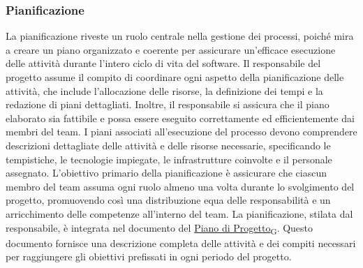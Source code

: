 \subsubsection{Pianificazione}
La pianificazione riveste un ruolo centrale nella gestione dei processi, poiché mira a creare un piano organizzato e coerente per assicurare un’efficace esecuzione delle attività durante l’intero ciclo di vita del software.
Il responsabile del progetto assume il compito di coordinare ogni aspetto della pianificazione delle attività, che include l’allocazione delle risorse, la definizione dei tempi e la redazione di piani dettagliati. Inoltre, il responsabile si assicura che il piano elaborato sia fattibile e possa essere eseguito correttamente ed efficientemente dai membri del team.
I piani associati all’esecuzione del processo devono comprendere descrizioni dettagliate delle attività e delle risorse necessarie, specificando le tempistiche, le tecnologie impiegate, le infrastrutture coinvolte e il personale assegnato.
L’obiettivo primario della pianificazione è assicurare che ciascun membro del team assuma ogni ruolo almeno una volta durante lo svolgimento del progetto, promuovendo così una distribuzione equa delle responsabilità e un arricchimento delle competenze all’interno del team.
La pianificazione, stilata dal responsabile, è integrata nel documento del \href{https://7last.github.io/docs/rtb/glossario#piano di progetto}{Piano di Progetto\textsubscript{G}}. Questo documento fornisce una descrizione completa delle attività e dei compiti necessari per raggiungere gli obiettivi prefissati in ogni periodo del progetto.

